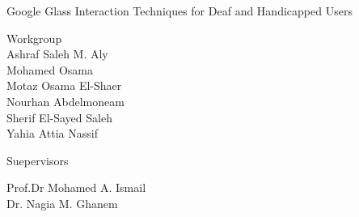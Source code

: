 \documentclass[12pt,fleqn]{book} %
\begin{document}

\begingroup
\thispagestyle{empty}
\centering

\par\normalfont\fontsize{30}{30}\sffamily\selectfont
Google Glass Interaction Techniques for Deaf and Handicapped Users\par %
\vspace*{16cm}

\begin{multicols}{2}
\raggedright
{\huge Workgroup \\ \vspace*{15pt}   \large Ashraf Saleh M. Aly\\ Mohamed Osama\\ Motaz Osama El-Shaer\\ Nourhan Abdelmoneam\\  Sherif El-Sayed Saleh\\ Yahia Attia Nassif\\} %
\columnbreak

{\huge Suepervisors \\ \vspace*{15pt} \raggedright \large Prof.Dr Mohamed A. Ismail \\ Dr. Nagia M. Ghanem\\}
\end{multicols}


\endgroup


\newpage
~\vfill
\thispagestyle{empty}

\end{document}
